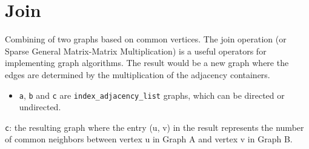 \section{Join}
Combining of two graphs based on common vertices. The join operation (or Sparse General Matrix-Matrix Multiplication) is a useful operators for implementing graph algorithms. The result would be a new graph where the edges are determined by the multiplication of the adjacency containers. 

{\small
      
}
\begin{itemdescr}
    \pnum\preconditions
    \begin{itemize}
          \item
                \lstinline{a}, \lstinline{b} and \lstinline{c} are \lstinline{index_adjacency_list} graphs, which can be directed or undirected.
    \end{itemize}
    \pnum\effects \lstinline{c}: the resulting graph where the entry (u, v) in the result represents the number of common neighbors between vertex u in Graph A and vertex v in Graph B.
\end{itemdescr}